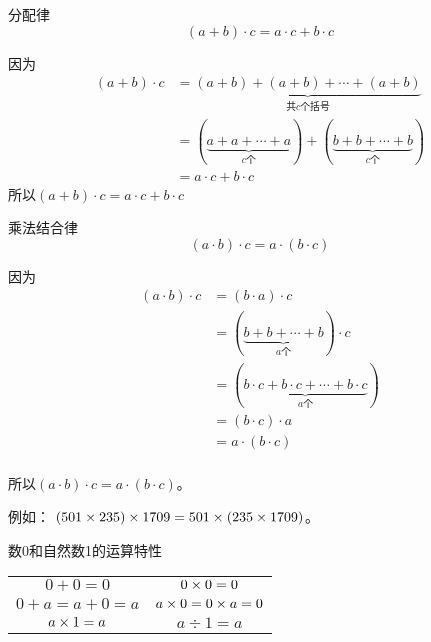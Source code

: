 \begin{blk}{分配律}
    \[(a+b)\cdot c=a\cdot c+b\cdot c \]
    \end{blk}
\begin{note}
    因为
\begin{align*}
    (a+b)\cdot c&=\underbrace{(a+b)+(a+b)+\cdots+(a+b)}_{\text{共$c$个括号}} \tag{乘法的意义}\\
    &=(\underbrace{a+a+\cdots+a}_{c\text{个}})+(\underbrace{b+b+\cdots +b}_{c\text{个}})\tag{加法结合律与交换律}\\
    &=a\cdot c+b\cdot c   \tag{乘法的意义} 
\end{align*}
所以$(a+b)\cdot c=a\cdot c+b\cdot c $
\end{note}


\begin{blk}{乘法结合律}
    \[(a\cdot b)\cdot c=a\cdot (b\cdot c) \]
    \end{blk}

\begin{note}
    因为
    \begin{align*}
        (a\cdot b)\cdot c&=(b\cdot a)\cdot c \tag{乘法交换律}\\
        &=(\underbrace{b+b+\cdots +b}_{a\text{个}})\cdot c \tag{乘法的意义}\\
        &=(\underbrace{b\cdot c+b\cdot c+\cdots +b\cdot c}_{a\text{个}})  \tag{分配律} \\
        &=(b\cdot c)\cdot a \tag{乘法的意义}\\
        &=a\cdot (b\cdot c) \tag{乘法交换律}\\
    \end{align*}

    所以$(a\cdot b)\cdot c=a\cdot (b\cdot c)$。

    例如：  $(501\times   235) \times 1709=501\times    (235 \times 1709)$。    
\end{note}
    
\begin{blk}{数0和自然数1的运算特性}
    \begin{center}
        \begin{tabular}{cc}
        $0+0=0$   &   $0\times 0=0$\\
        $0+a=a+0=a$   &   $a\times 0=0\times a=0$\\
        $a\times 1=a$   &   $a\div 1=a$\\       
        \end{tabular}     
    \end{center}
\end{blk}

